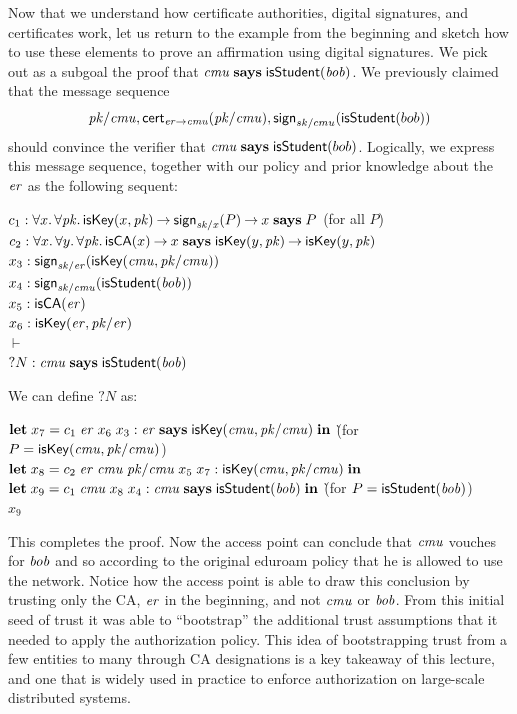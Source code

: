 \documentclass[11pt]{article}
\begin{document}
Now that we understand how certificate authorities, digital signatures, and
certificates work, let us return to the example from the beginning and sketch
how to use these elements to prove an affirmation using digital signatures.  We
pick out as a subgoal the proof that
$\mathit{cmu}\; \mathbf{says}\; \mathsf{isStudent}(\mathit{bob})$.  We previously claimed that
the message sequence
\[
  \mathit{pk/cmu}, \mathsf{cert}_{{\mathit{er}} \mathbin{\rightarrow} {\mathit{cmu}}}(\mathit{pk/cmu}), \mathsf{sign}_{sk/cmu}(\mathsf{isStudent}(bob))
\]
should convince the verifier that $\mathit{cmu} \mathrel{\mathbf{says}} \mathsf{isStudent}(bob)$.
Logically, we express this message sequence, together with our policy and prior
knowledge about the $\mathit{er}$ as the following sequent:
\begin{tabbing}
  $c_1 : \forall x.\, \forall \mathit{pk}.\, \mathsf{isKey}(x, \mathit{pk}) \mathbin{\rightarrow} \mathsf{sign}_{\mathit{sk/x}}(P) \mathbin{\rightarrow} x \mathrel{\mathbf{says}} P$
  \quad (for all $P$) \\
  $c_2 : \forall x.\, \forall y.\, \forall \mathit{pk}.\,
  \mathsf{isCA}(x) \mathbin{\rightarrow} x \mathrel{\mathbf{says}} \mathsf{isKey}(y, \mathit{pk}) \mathbin{\rightarrow} \mathsf{isKey}(y, \mathit{pk})$ \\[1ex]
  $x_3 : \mathsf{sign}_{\mathit{sk/er}}(\mathsf{isKey}(\mathit{cmu}, \mathit{pk/cmu}))$ \\
  $x_4 : \mathsf{sign}_{\mathit{sk/cmu}}(\mathsf{isStudent}(\mathit{bob}))$ \\
  $x_5 : \mathsf{isCA}(\mathit{er})$ \\
  $x_6 : \mathsf{isKey}(\mathit{er}, \mathit{pk/er})$ \\
  $\vdash$ \\
  ${?}N : \mathit{cmu} \mathrel{\mathbf{says}} \mathsf{isStudent}(\mathit{bob})$
\end{tabbing}
We can define ${?}N$ as:
\begin{tabbing}
  $\mathbf{let}\; x_7 = c_1\; \mathit{er}\; x_6\; x_3 : \mathit{er} \mathrel{\mathbf{says}} \mathsf{isKey}(\mathit{cmu}, \mathit{pk/cmu})\; \mathbf{in}$
  \` (for $P = \mathsf{isKey}(\mathit{cmu}, \mathit{pk/cmu})$) \\
  $\mathbf{let}\; x_8 = c_2\; \mathit{er}\; \mathit{cmu}\; \mathit{pk/cmu}\; x_5\; x_7 : \mathsf{isKey}(\mathit{cmu}, \mathit{pk/cmu})\; \mathbf{in}$ \\
  $\mathbf{let}\; x_9 = c_1\; \mathit{cmu}\; x_8\; x_4 : \mathit{cmu} \mathrel{\mathbf{says}} \mathsf{isStudent}(\mathit{bob})\; \mathbf{in}$
  \` (for $P = \mathsf{isStudent}(\mathit{bob})$) \\
  $x_9$
\end{tabbing}

This completes the proof. Now the access point can conclude that $\mathit{cmu}$
vouches for $\mathit{bob}$ and so according to the original eduroam policy that he
is allowed to use the network. Notice how the access point is able to draw this
conclusion by trusting only the CA, $\mathit{er}$ in the beginning, and not
$\mathit{cmu}$ or $\mathit{bob}$. From this initial seed of trust it was able to
``bootstrap'' the additional trust assumptions that it needed to apply the
authorization policy. This idea of bootstrapping trust from a few entities to
many through CA designations is a key takeaway of this lecture, and one that is
widely used in practice to enforce authorization on large-scale distributed
systems.
\end{document}
